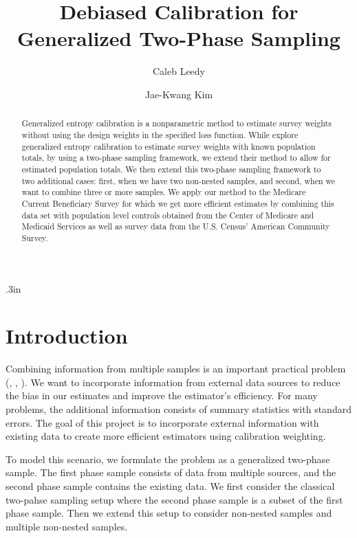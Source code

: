 \documentclass[12pt]{article}
\begin{document}
\title{Debiased Calibration for Generalized Two-Phase Sampling}
\author{Caleb Leedy \and  Jae-Kwang Kim}
\maketitle 

\baselineskip .3in

\begin{abstract}
Generalized entropy calibration \cite{gneiting2007strictly} is a nonparametric
method to estimate survey weights without using the design weights in the
specified loss function. While \cite{kwon2024debiased} explore generalized
entropy calibration to estimate survey weights with known population totals, by
using a two-phase sampling framework, we extend their method to allow for
estimated population totals. We then extend this two-phase sampling framework to
two additional cases: first, when we have two non-nested samples, and
second, when we want to combine three or more samples. 
We apply our method to the Medicare Current Beneficiary Survey for which we
get more efficient estimates by combining this data set with population level
controls obtained from the Center of Medicare and Medicaid Services as well as
survey data from the U.S. Census' American Community Survey.
\end{abstract}
\newpage 

\section{Introduction}

Combining information from multiple samples is an important practical problem
(\cite{yang2020statistical}, \cite{yang2023elastic}, \cite{dagdoug2023model}).
We want to incorporate information from external data sources to reduce the bias
in our estimates and improve the estimator's efficiency. For many problems, the
additional information consists of summary statistics with standard errors. The
goal of this project is to incorporate external information with existing data 
to create more efficient estimators using calibration weighting.

To model this scenario, we formulate the problem as a generalized two-phase
sample. The first phase sample consists of data from multiple sources, and the
second phase sample contains the existing data. We first consider the classical
two-pahse sampling setup where the second phase sample is a subset of the first
phase sample. Then we extend this setup to consider non-nested samples and
multiple non-nested samples.
\end{document}
